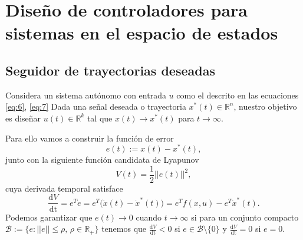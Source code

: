 \chapter{Diseño de controladores para sistemas en el espacio de estados}

\section{Seguidor de trayectorias deseadas}
Considera un sistema autónomo con entrada $u$ como el descrito en las ecuaciones \ref{eq:6}, \ref{eq:7} Dada una señal deseada o trayectoria $x^*(t)\in\mathbb{R}^n$, nuestro objetivo es diseñar $u(t)\in\mathbb{R}^k$ tal que $x(t) \to x^*(t)$ para $t\to\infty$.

Para ello vamos a construir la función de error
\begin{equation}
	e(t) := x(t) - x^*(t),
\end{equation}
junto con la siguiente función candidata de Lyapunov
\begin{equation}
	V(t) = \frac{1}{2}||e(t)||^2,
	\label{eq: lyaE}
\end{equation}
cuya derivada temporal satisface
\begin{equation}
	\frac{\mathrm{d}V}{\mathrm{dt}} = e^T\dot e = e^T\big(\dot x(t) - \dot x^*(t)\big) = e^Tf(x,u) - e^T \dot x^*(t).
\end{equation}
Podemos garantizar que $e(t)\to 0$ cuando $t\to\infty$ si para un conjunto compacto $\mathcal{B} := \{e : ||e|| \leq \rho, \, \rho\in\mathbb{R}_+ \}$ tenemos que $\frac{\mathrm{d}V}{\mathrm{dt}} < 0$ si $e\in\mathcal{B} \setminus \{0\}$ y $\frac{\mathrm{d}V}{\mathrm{dt}} = 0$ si $e = 0$.

